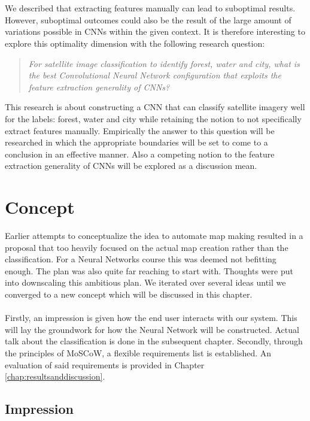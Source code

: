 \documentclass[a4paper,onecolumn]{report}
\begin{document}
\\\\
We described that extracting features manually can lead to suboptimal results. However, suboptimal outcomes could also be the result of the large amount of variations possible in CNNs within the given context. It is therefore interesting to explore this optimality dimension with the following research question: 
\begin{quote}
\emph{For satellite image classification to identify forest, water and city, what is the best Convolutional Neural Network configuration that exploits the feature extraction generality of CNNs?}
\end{quote}
This research is about constructing a CNN that can classify satellite imagery well for the labels: forest, water and city while retaining the notion to not specifically extract features manually. Empirically the answer to this question will be researched in which the appropriate boundaries will be set to come to a conclusion in an effective manner. Also a competing notion to the feature extraction generality of CNNs will be explored as a discussion mean.

\chapter{Concept}
\label{chap:concept}
Earlier attempts to conceptualize the idea to automate map making resulted in a proposal that too heavily focused on the actual map creation rather than the classification. For a Neural Networks course this was deemed not befitting enough. The plan was also quite far reaching to start with. Thoughts were put into downscaling this ambitious plan. We iterated over several ideas until we converged to a new concept which will be discussed in this chapter.
\\\\
Firstly, an impression is given how the end user interacts with our system. This will lay the groundwork for how the Neural Network will be constructed. Actual talk about the classification is done in the subsequent chapter. Secondly, through the principles of MoSCoW, a flexible requirements list is established. An evaluation of said requirements is provided in Chapter \ref{chap:resultsanddiscussion}.

\section{Impression}
\end{document}
